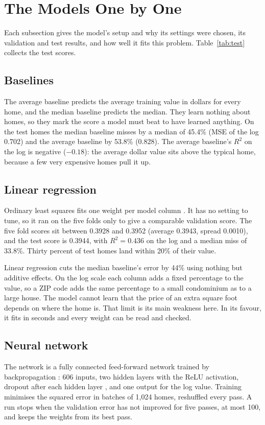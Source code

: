 \documentclass[sigconf,nonacm,10pt]{acmart}
\begin{document}
\section{The Models One by One}
\label{sec:models}

Each subsection gives the model's setup and why its settings were chosen, its validation and test results, and how well it fits this problem. Table~\ref{tab:test} collects the test scores.

\subsection{Baselines}
The average baseline predicts the average training value in dollars for every home, and the median baseline predicts the median. They learn nothing about homes, so they mark the score a model must beat to have learned anything. On the test homes the median baseline misses by a median of 45.4\% (MSE of the log 0.702) and the average baseline by 53.8\% (0.828). The average baseline's $R^2$ on the log is negative ($-0.18$): the average dollar value sits above the typical home, because a few very expensive homes pull it up.

\subsection{Linear regression}
Ordinary least squares fits one weight per model column \cite{hastie2009}. It has no setting to tune, so it ran on the five folds only to give a comparable validation score. The five fold scores sit between 0.3928 and 0.3952 (average 0.3943, spread 0.0010), and the test score is 0.3944, with $R^2 = 0.436$ on the log and a median miss of 33.8\%. Thirty percent of test homes land within 20\% of their value.

Linear regression cuts the median baseline's error by 44\% using nothing but additive effects. On the log scale each column adds a fixed percentage to the value, so a ZIP code adds the same percentage to a small condominium as to a large house. The model cannot learn that the price of an extra square foot depends on where the home is. That limit is its main weakness here. In its favour, it fits in seconds and every weight can be read and checked.

\subsection{Neural network}
The network is a fully connected feed-forward network trained by backpropagation \cite{rumelhart1986}: 606 inputs, two hidden layers with the ReLU activation, dropout after each hidden layer \cite{srivastava2014}, and one output for the log value. Training minimises the squared error in batches of 1,024 homes, reshuffled every pass. A run stops when the validation error has not improved for five passes, at most 100, and keeps the weights from its best pass.
\end{document}
